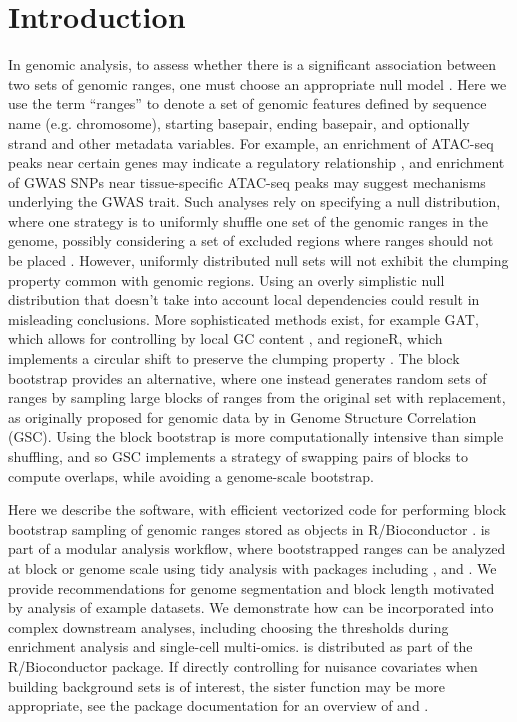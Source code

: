 \section{Introduction}

In genomic analysis, to assess whether
there is a significant association between two sets of genomic ranges, 
one must choose an appropriate null model \citep{reviewdilemma2014,kanduri2018}.
Here we use the term ``ranges'' to denote a set of genomic features
defined by sequence name (e.g. chromosome), starting basepair, ending
basepair, and optionally strand and other metadata variables.
For example, an enrichment of ATAC-seq peaks near certain genes
may indicate a regulatory relationship \citep{lee2020fluent}, 
and enrichment of GWAS SNPs near tissue-specific ATAC-seq peaks may
suggest mechanisms underlying the GWAS trait.
Such analyses rely on specifying a null distribution, where one
strategy is to uniformly shuffle one set of the
genomic ranges in the genome, possibly considering a set of
excluded regions where ranges should not be placed \citep{excluderanges}.
However, uniformly distributed null sets will not exhibit the
clumping property common with genomic regions.
Using an overly simplistic null distribution that doesn't take into
account local dependencies could result in misleading conclusions.
More sophisticated methods exist, for example
GAT, which allows for controlling by local GC content
\citep{GAT_2013}, and regioneR, which implements a circular shift to
preserve the clumping property \citep{gel2016regioner}.
The block bootstrap \citep{politis1999subsampling}
provides an alternative, where one instead generates
random sets of ranges by sampling large blocks of ranges from the
original set with replacement, as originally proposed for 
genomic data by \citet{bickel2010subsampling} in Genome Structure
Correlation (GSC).
Using the block bootstrap is more
computationally intensive than simple shuffling, and so GSC implements
a strategy of swapping pairs of blocks to compute overlaps, while
avoiding a genome-scale bootstrap.

Here we describe the \bootranges software, with efficient
vectorized code for performing block bootstrap sampling of genomic ranges
stored as \granges objects in R/Bioconductor
\citep{lawrence2013software}.
\bootranges is part of a modular analysis workflow, where bootstrapped
ranges can be analyzed at block or genome scale using tidy
analysis with packages including \plyranges \citep{lee2019plyranges},
and \tidybulk \citep{mangiola2021tidybulk}.
We provide recommendations for genome segmentation and block length
motivated by analysis of example datasets.
We demonstrate how \bootranges can be incorporated into complex
downstream analyses, including choosing the thresholds during
enrichment analysis and single-cell multi-omics.
\bootranges is distributed as part of the \nullranges R/Bioconductor package.
If directly controlling for nuisance covariates when building
background sets is of interest, the sister function \matchranges \citep{Davis2022matchranges}
may be more appropriate, see the package documentation for an overview of
\bootranges and \matchranges.

